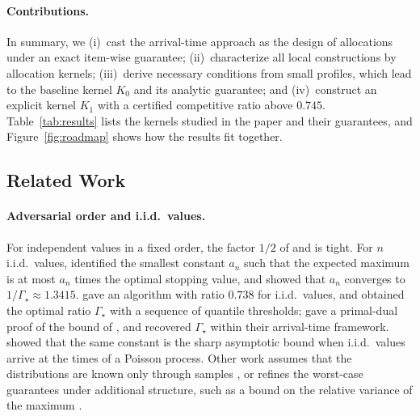 \documentclass[11pt]{article}
\theoremstyle{definition}
\theoremstyle{remark}
\begin{document}
\paragraph{Contributions.}
In summary, we (i)~cast the arrival-time approach as the design of allocations under an exact
item-wise guarantee; (ii)~characterize all local constructions by allocation kernels;
(iii)~derive necessary conditions from small profiles, which lead to the baseline kernel
$K_0$ and its analytic guarantee; and (iv)~construct an explicit kernel $K_1$ with a certified
competitive ratio above $0.745$. Table~\ref{tab:results} lists the kernels studied in the
paper and their guarantees, and Figure~\ref{fig:roadmap} shows how the results fit together.

\subsection{Related Work}\label{sec:related}

\paragraph{Adversarial order and i.i.d.\ values.}
For independent values in a fixed order, the factor $1/2$ of \citet{KS77,KS78} and
\citet{SC84} is tight. For $n$ i.i.d.\ values, \citet{HK82} identified the smallest constant
$a_n$ such that the expected maximum is at most $a_n$ times the optimal stopping value, and
\citet{Kertz86} showed that $a_n$ converges to $1/\Gamma_\star\approx1.3415$. \citet{AEEHKL17}
gave an algorithm with ratio $0.738$ for i.i.d.\ values, and \citet{CFHOV21} obtained the
optimal ratio $\Gamma_\star$ with a sequence of quantile thresholds; \citet{LPPSS21} gave a
primal-dual proof of the bound of \citet{Kertz86}, and \citet{PT} recovered $\Gamma_\star$
within their arrival-time framework. \citet{Allaart07} showed that the same constant is the
sharp asymptotic bound when i.i.d.\ values arrive at the times of a Poisson process. Other
work assumes that the distributions are known only through samples
\citep{AKW14,CDFS22,RWW20}, or refines the worst-case guarantees under additional structure,
such as a bound on the relative variance of the maximum \citep{LMPPV26}.
\end{document}
